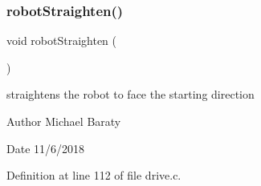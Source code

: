 \mbox{\label{drive_8c_a53fb069f33735f517bdff54c69b8e860}} 
\subsubsection{robot\+Straighten()}
{\footnotesize\ttfamily void robot\+Straighten (\begin{DoxyParamCaption}{ }\end{DoxyParamCaption})}



straightens the robot to face the starting direction 

\begin{DoxyAuthor}{Author}
Michael Baraty 
\end{DoxyAuthor}
\begin{DoxyDate}{Date}
11/6/2018 
\end{DoxyDate}


Definition at line 112 of file drive.\+c.

